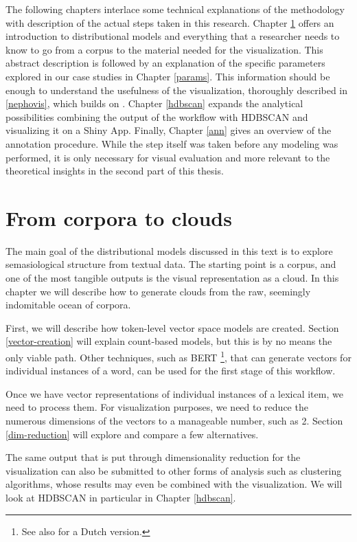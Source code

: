 \documentclass[
]{book}
\begin{document}
The following chapters interlace some technical explanations of the methodology with
description of the actual steps taken in this research. Chapter \ref{workflow} offers an introduction
to distributional models and everything that a researcher needs to know to go from a corpus
to the material needed for the visualization. This abstract description is followed by
an explanation of the specific parameters explored in our case studies in Chapter \ref{params}.
This information should be enough to understand the usefulness of the visualization,
thoroughly described in \ref{nephovis}, which builds on \textcite{montes.heylen_Submitted}.
Chapter \ref{hdbscan} expands the analytical possibilities combining the output of the workflow
with HDBSCAN and visualizing it on a Shiny App.
Finally, Chapter \ref{ann} gives an overview of the annotation procedure. While the step itself
was taken before any modeling was performed, it is only necessary for visual evaluation
and more relevant to the theoretical insights in the second part of this thesis.

\hypertarget{workflow}{%
\chapter{From corpora to clouds}\label{workflow}}

The main goal of the distributional models discussed in this text is to explore semasiological structure from textual data.
The starting point is a corpus, and one of the most tangible outputs is the visual representation as a cloud.
In this chapter we will describe how to generate clouds from the raw, seemingly indomitable ocean of corpora.

First, we will describe how token-level vector space models are created.
Section \ref{vector-creation} will explain count-based models, but this is by no means the only viable path.
Other techniques, such as BERT \autocite{BERT}\footnote{See also \textcite{devries.etal_2019} for a Dutch version.}, that can generate vectors for individual instances of a word,
can be used for the first stage of this workflow.

Once we have vector representations of individual instances of a lexical item, we need to process them.
For visualization purposes, we need to reduce the numerous dimensions of the vectors to a manageable number, such as 2.
Section \ref{dim-reduction} will explore and compare a few alternatives.

The same output that is put through dimensionality reduction for the visualization can also
be submitted to other forms of analysis such as clustering algorithms, whose results may
even be combined with the visualization. We will look at HDBSCAN in particular in Chapter \ref{hdbscan}.
\end{document}
